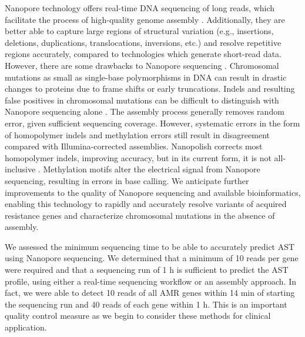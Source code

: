 Nanopore technology offers real-time DNA sequencing of long reads, which facilitate the process of high-quality genome assembly \citep{Lu2016-ru}. Additionally, they are better able to capture large regions of structural variation (e.g., insertions, deletions, duplications, translocations, inversions, etc.) and resolve repetitive regions accurately, compared to technologies which generate short-read data. However, there are some drawbacks to Nanopore sequencing \citep{Lu2016-ru}. Chromosomal mutations as small as single-base polymorphisms in DNA can result in drastic changes to proteins due to frame shifts or early truncations. Indels and resulting false positives in chromosomal mutations can be difficult to distinguish with Nanopore sequencing alone \citep{Jain2018-qp}. The assembly process generally removes random error, given sufficient sequencing coverage. However, systematic errors in the form of homopolymer indels and methylation errors still result in disagreement compared with Illumina-corrected assemblies. Nanopolish corrects most homopolymer indels, improving accuracy, but in its current form, it is not all-inclusive \citep{Loman2015-nf}. Methylation motifs alter the electrical signal from Nanopore sequencing, resulting in errors in base calling. We anticipate further improvements to the quality of Nanopore sequencing and available bioinformatics, enabling this technology to rapidly and accurately resolve variants of acquired resistance genes and characterize chromosomal mutations in the absence of assembly.

We assessed the minimum sequencing time to be able to accurately predict AST using Nanopore sequencing. We determined that a minimum of 10 reads per gene were required and that a sequencing run of 1 h is sufficient to predict the AST profile, using either a real-time sequencing workflow or an assembly approach. In fact, we were able to detect 10 reads of all AMR genes within 14 min of starting the sequencing run and 40 reads of each gene within 1 h. This is an important quality control measure as we begin to consider these methods for clinical application.

